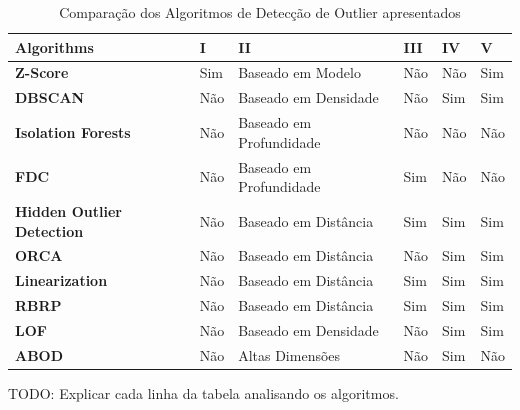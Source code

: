 \begin{table}[]
	\centering
	\begin{tabular}{|l|l|l|l|l|l|}
		\hline
		\textbf{Algorithms}               & \textbf{I} & \textbf{II}             & \textbf{III} & \textbf{IV} & \textbf{V} \\ \hline
		\textbf{Z-Score}                  & Sim        & Baseado em Modelo       & Não          & Não         & Sim        \\ \hline
		\textbf{DBSCAN}                   & Não        & Baseado em Densidade    & Não          & Sim         & Sim        \\ \hline
		\textbf{Isolation Forests}        & Não        & Baseado em Profundidade & Não          & Não         & Não        \\ \hline
		\textbf{FDC}                      & Não        & Baseado em Profundidade & Sim          & Não         & Não        \\ \hline
		\textbf{Hidden Outlier Detection} & Não        & Baseado em Distância    & Sim          & Sim         & Sim        \\ \hline
		\textbf{ORCA}                     & Não        & Baseado em Distância    & Não          & Sim         & Sim        \\ \hline
		\textbf{Linearization}            & Não        & Baseado em Distância    & Sim          & Sim         & Sim        \\ \hline
		\textbf{RBRP}                     & Não        & Baseado em Distância    & Sim          & Sim         & Sim        \\ \hline
		\textbf{LOF}                      & Não        & Baseado em Densidade    & Não          & Sim         & Sim        \\ \hline
		\textbf{ABOD}                     & Não        & Altas Dimensões         & Não          & Sim         & Não        \\ \hline
	\end{tabular}
	\caption{Comparação dos Algoritmos de Detecção de Outlier apresentados}
	\label{table:algorithms-comparison}
\end{table}

TODO: Explicar cada linha da tabela analisando os algoritmos.


